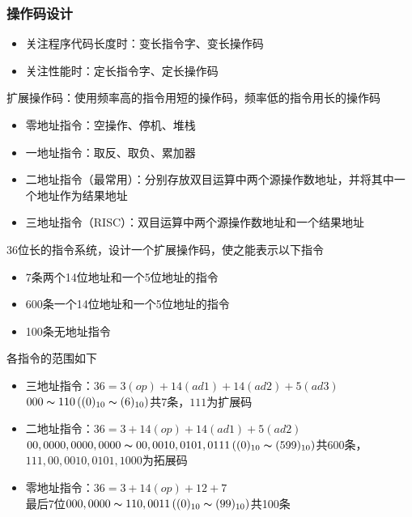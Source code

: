 \subsubsection{操作码设计}
\begin{itemize}
	\item 关注程序代码长度时：变长指令字、变长操作码
	\item 关注性能时：定长指令字、定长操作码
\end{itemize}
扩展操作码：使用频率高的指令用短的操作码，频率低的指令用长的操作码
\begin{itemize}
	\item 零地址指令：空操作、停机、堆栈
	\item 一地址指令：取反、取负、累加器
	\item 二地址指令（最常用）：分别存放双目运算中两个源操作数地址，并将其中一个地址作为结果地址
	\item 三地址指令（RISC）：双目运算中两个源操作数地址和一个结果地址
\end{itemize}
\begin{example}
36位长的指令系统，设计一个扩展操作码，使之能表示以下指令
\begin{itemize}
	\item 7条两个14位地址和一个5位地址的指令
	\item 600条一个14位地址和一个5位地址的指令
	\item 100条无地址指令
\end{itemize}
\end{example}
\begin{analysis}
各指令的范围如下
\begin{itemize}
\item 三地址指令：$36=3(op)+14(ad1)+14(ad2)+5(ad3)$\\
$000\thicksim 110\,((0)_{10}\thicksim(6)_{10})$共7条，$111$为扩展码
\item 二地址指令：$36=3+14(op)+14(ad1)+5(ad2)$\\
$00,0000,0000,0000\thicksim 00,0010,0101,0111\,((0)_{10}\thicksim(599)_{10})$共600条，$111,00,0010,0101,1000$为拓展码
\item 零地址指令：$36=3+14(op)+12+7$\\
最后7位$000,0000\thicksim 110,0011\,((0)_{10}\thicksim(99)_{10})$共100条
\end{itemize}
\end{analysis}

